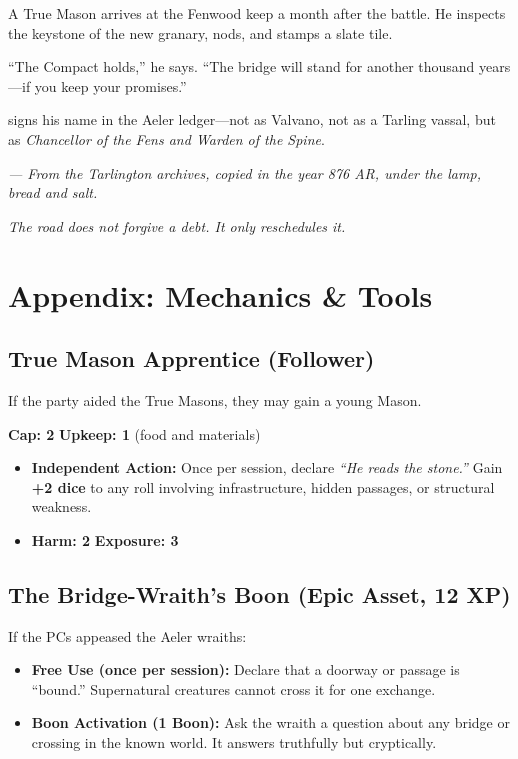 \documentclass[11pt,a5paper]{book}
\begin{document}
\lettrine{A}{} True Mason arrives at the Fenwood keep a month after the battle. He inspects the keystone of the new granary, nods, and stamps a slate tile.

``The Compact holds,'' he says. ``The bridge will stand for another thousand years---if you keep your promises.''

\aldric{} signs his name in the Aeler ledger---not as Valvano, not as a Tarling vassal, but as \textit{Chancellor of the Fens and Warden of the Spine}.

\vspace{2em}
\noindent\textit{--- From the Tarlington archives, copied in the year 876 AR, under the lamp, bread and salt.}

\vspace{2em}
\noindent\textit{The road does not forgive a debt. It only reschedules it.}

\clearpage

\appendix
\chapter*{Appendix: Mechanics \& Tools}

\section*{True Mason Apprentice (Follower)}

If the party aided the True Masons, they may gain a young Mason.

\textbf{Cap: 2} \quad \textbf{Upkeep: 1} (food and materials)
\begin{itemize}[leftmargin=*]
\item \textbf{Independent Action:} Once per session, declare \textit{``He reads the stone.''} Gain \textbf{+2 dice} to any roll involving infrastructure, hidden passages, or structural weakness.
\item \textbf{Harm: 2} \quad \textbf{Exposure: 3}
\end{itemize}

\section*{The Bridge-Wraith's Boon (Epic Asset, 12 XP)}

If the PCs appeased the Aeler wraiths:
\begin{itemize}[leftmargin=*]
\item \textbf{Free Use (once per session):} Declare that a doorway or passage is ``bound.'' Supernatural creatures cannot cross it for one exchange.
\item \textbf{Boon Activation (1 Boon):} Ask the wraith a question about any bridge or crossing in the known world. It answers truthfully but cryptically.
\end{itemize}
\end{document}
